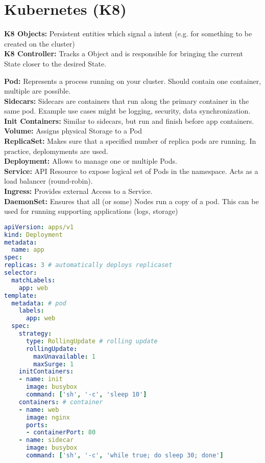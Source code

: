 \section{Kubernetes (K8)}
\begin{mdframed}
	\textbf{K8 Objects:} Persistent entities which signal a intent (e.g. for something to be created on the cluster) \\
	\textbf{K8 Controller:} Tracks a Object and is responsible for bringing the current State closer to the desired State.
\end{mdframed}

\textbf{Pod:} Represents a process running on your cluster. Should contain one container, multiple are possible. \\
\textbf{Sidecars:} Sidecars are containers that run along the primary container in the same pod. Example use cases might be logging, security, data synchronization. \\
\textbf{Init Containers:} Similar to sidecars, but run and finish before app containers.
\textbf{Volume:} Assigns physical Storage to a Pod \\
\textbf{ReplicaSet:} Makes sure that a specified number of replica pods are running. In practice, deplomyments are used. \\
\textbf{Deployment:} Allows to manage one or multiple Pods. \\
\textbf{Service:} API Resource to expose logical set of Pods in the namespace. Acts as a load balancer (round-robin). \\
\textbf{Ingress:} Provides external Access to a Service. \\
\textbf{DaemonSet:} Ensures that all (or some) Nodes run a copy of a pod. This can be used for running supporting applications (logs, storage)
\begin{lstlisting}[language=yaml]
apiVersion: apps/v1
kind: Deployment
metadata:
  name: app
spec:
replicas: 3 # automatically deploys replicaset
selector:
  matchLabels:
    app: web
template:
  metadata: # pod
    labels:
      app: web
  spec:
    strategy:
      type: RollingUpdate # rolling update
      rollingUpdate:
        maxUnavailable: 1
        maxSurge: 1
    initContainers:
    - name: init
      image: busybox
      command: ['sh', '-c', 'sleep 10']
    containers: # container
    - name: web
      image: nginx
      ports:
      - containerPort: 80
    - name: sidecar
      image: busybox
      command: ['sh', '-c', 'while true; do sleep 30; done']
\end{lstlisting}


